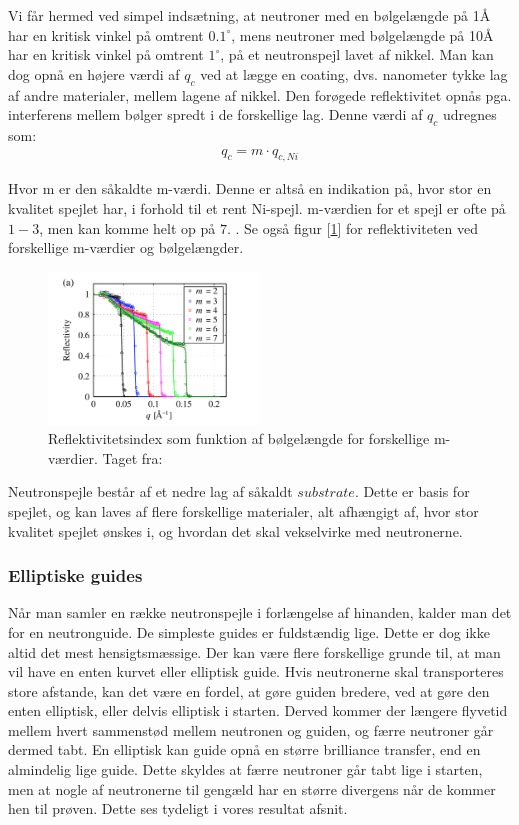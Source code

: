 \documentclass[12pt,oneside,a4paper]{article}
\begin{document}
{{{{{Vi får hermed ved simpel indsætning, at neutroner med en bølgelængde på 1Å har en kritisk vinkel på omtrent $0.1^∘$, mens neutroner med bølgelængde på 10Å har en kritisk vinkel på omtrent $1^∘$, på et neutronspejl lavet af nikkel.
Man kan dog opnå en højere værdi af $q_c$ ved at lægge en coating, dvs. nanometer tykke lag af andre materialer, mellem lagene af nikkel. Den forøgede reflektivitet opnås pga. interferens mellem bølger spredt i de forskellige lag. Denne værdi af $q_c$ udregnes som:
\begin{align}
q_c=m \cdot q_{c,Ni}
\end{align}

Hvor m er den såkaldte m-værdi. Denne er altså en indikation på, hvor stor en kvalitet spejlet har, i forhold til et rent Ni-spejl. m-værdien for et spejl er ofte på $1-3$, men kan komme helt op på $7$. \cite{lefmann_arleth_kirkensgaard_lebech_thomsen}. Se også figur [\ref{fig:m_values_lambda}] for reflektiviteten ved forskellige m-værdier og bølgelængder.

\begin{figure}[H]
    \centering
    \includegraphics[width=0.5\textwidth]{m-values-lambda.png}
    \caption{Reflektivitetsindex som funktion af bølgelængde for forskellige m-værdier. Taget fra: \cite{Jacobsen201369}} \label{fig:m_values_lambda}
\end{figure}

Neutronspejle består af et nedre lag af såkaldt $substrate$. Dette er basis for spejlet, og kan laves af flere forskellige materialer, alt afhængigt af, hvor stor kvalitet spejlet ønskes i, og hvordan det skal vekselvirke med neutronerne.

\subsubsection{Elliptiske guides}
Når man samler en række neutronspejle i forlængelse af hinanden, kalder man det for en neutronguide. De simpleste guides er fuldstændig lige. Dette er dog ikke altid det mest hensigtsmæssige. Der kan være flere forskellige grunde til, at man vil have en enten kurvet eller elliptisk guide. 
Hvis neutronerne skal transporteres store afstande, kan det være en fordel, at gøre guiden bredere, ved at gøre den enten elliptisk, eller delvis elliptisk i starten. Derved kommer der længere flyvetid mellem hvert sammenstød mellem neutronen og guiden, og færre neutroner går dermed tabt. 
En elliptisk kan guide opnå en større brilliance transfer, end en almindelig lige guide. Dette skyldes at færre neutroner går tabt lige  i starten, men at nogle af neutronerne til gengæld har en større divergens når de kommer hen til prøven. Dette ses tydeligt i vores resultat afsnit.

}}}}}
\end{document}
